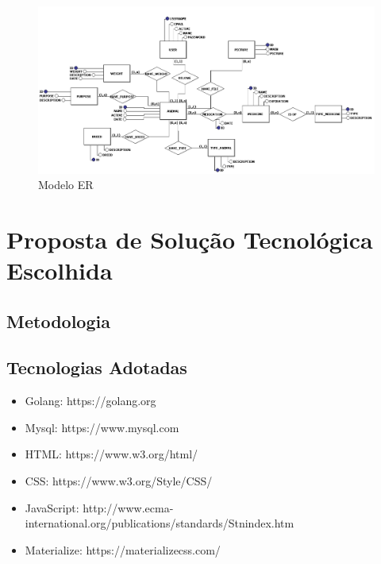 \documentclass[12pt]{article}
\begin{document}
\begin{titlepage}
\begin{figure}[!h]
\begin{center}
\caption{Modelo ER}
\includegraphics[width=6in]{img/erdoboi.jpeg}


\end{center}
\end{figure}

\newpage

\section{Proposta de Solução Tecnológica Escolhida}

\subsection{Metodologia}


\subsection{Tecnologias Adotadas}

\begin{itemize}
	\item Golang: https://golang.org	
	\item Mysql: https://www.mysql.com
	\item HTML: https://www.w3.org/html/
	\item CSS: https://www.w3.org/Style/CSS/
	\item JavaScript: http://www.ecma-international.org/publications/standards/Stnindex.htm
	\item Materialize: https://materializecss.com/
\end{itemize}


\end{titlepage}
\end{document}
